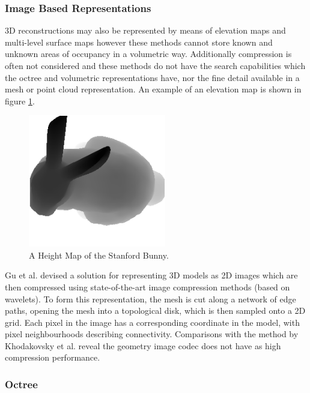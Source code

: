 \subsubsection{Image Based Representations}

3D reconstructions may also be represented by means of elevation maps \cite{Herbert89Terrain} and multi-level surface maps \cite{Triebel06Multi} however these methods cannot store known and unknown areas of occupancy in a volumetric way. Additionally compression is often not considered and these methods do not have the search capabilities which the octree and volumetric representations have, nor the fine detail available in a mesh or point cloud representation. An example of an elevation map is shown in figure \ref{fig:HeightMapExample}.\\


\begin{figure}[!htb]
\centering
\includegraphics[width=6cm]{images/literature/HeightMap}
\caption{A Height Map of the Stanford Bunny.}
\label{fig:HeightMapExample}
\end{figure}

Gu et al. \cite{Gu02Geometry} devised a solution for representing 3D models as 2D images which are then compressed using state-of-the-art image compression methods (based on wavelets). To form this representation, the mesh is cut along a network of edge paths, opening the mesh into a topological disk, which is then sampled onto a 2D grid. Each pixel in the image has a corresponding coordinate in the model, with pixel neighbourhoods describing connectivity. Comparisons with the method by Khodakovsky et al. reveal the geometry image codec does not have as high compression performance. \\


\subsubsection{Octree}

